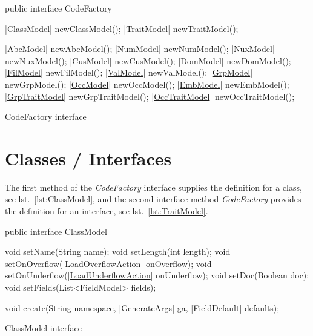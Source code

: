 \begin{elisting}[!htb]
\begin{javacode}
public interface CodeFactory {
    |\hyperref[lst:ClassModel]{ClassModel}| newClassModel();
    |\hyperref[lst:TraitModel]{TraitModel}| newTraitModel();

    |\hyperref[lst:AbcModel]{AbcModel}| newAbcModel();
    |\hyperref[lst:NumModel]{NumModel}| newNumModel();
    |\hyperref[lst:NuxModel]{NuxModel}| newNuxModel();
    |\hyperref[lst:CusModel]{CusModel}| newCusModel();
    |\hyperref[lst:DomModel]{DomModel}| newDomModel();
    |\hyperref[lst:FilModel]{FilModel}| newFilModel();
    |\hyperref[lst:ValModel]{ValModel}| newValModel();
    |\hyperref[lst:GrpModel]{GrpModel}| newGrpModel();
    |\hyperref[lst:OccModel]{OccModel}| newOccModel();
    |\hyperref[lst:EmbModel]{EmbModel}| newEmbModel();
    |\hyperref[lst:GrpTraitModel]{GrpTraitModel}| newGrpTraitModel();
    |\hyperref[lst:OccTraitModel]{OccTraitModel}| newOccTraitModel();
}
\end{javacode}
\caption{CodeFactory interface}
\label{lst:CodeFactory}
\end{elisting}

\section{Classes / Interfaces}
The first method of the \textsl{CodeFactory} interface supplies the definition 
for a class, see lst.~\ref{lst:ClassModel}, and the second interface method 
\textsl{CodeFactory} provides the definition for an interface, see 
lst.~\ref{lst:TraitModel}.

\begin{elisting}[!htb]
\begin{javacode}
public interface ClassModel {
    void setName(String name);
    void setLength(int length);
    void setOnOverflow(|\hyperref[lst:LoadOverflowAction]{LoadOverflowAction}| onOverflow);
    void setOnUnderflow(|\hyperref[lst:LoadUnderflowAction]{LoadUnderflowAction}| onUnderflow);
    void setDoc(Boolean doc);
    void setFields(List<FieldModel> fields);

    void create(String namespace, |\hyperref[lst:GenerateArgs]{GenerateArgs}| ga, |\hyperref[lst:FieldDefault]{FieldDefault}| defaults);
}
\end{javacode}
\caption{ClassModel interface}
\label{lst:ClassModel}
\end{elisting}

